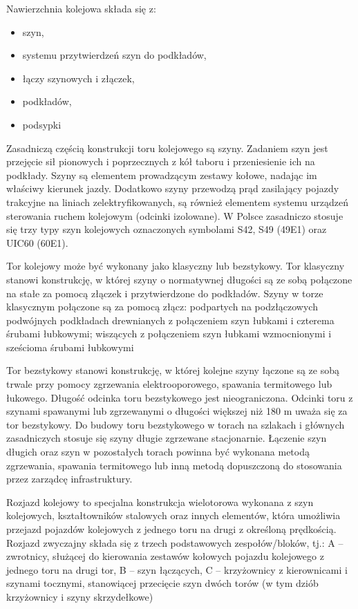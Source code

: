 Nawierzchnia kolejowa składa się z:
\begin{itemize}
\item szyn,
\item systemu przytwierdzeń szyn do podkładów,
\item łączy szynowych i złączek,
\item podkładów,
\item podsypki 
\end{itemize}


Zasadniczą częścią konstrukcji toru kolejowego są szyny. Zadaniem szyn jest przejęcie sił pionowych i poprzecznych z kół taboru i przeniesienie ich na podkłady. Szyny są elementem prowadzącym zestawy kołowe, nadając im właściwy kierunek jazdy. Dodatkowo szyny przewodzą prąd zasilający pojazdy trakcyjne na liniach zelektryfikowanych, są również elementem systemu urządzeń sterowania ruchem kolejowym (odcinki izolowane). W Polsce zasadniczo stosuje się trzy typy szyn kolejowych oznaczonych symbolami S42, S49 (49E1)
oraz UIC60 (60E1).

Tor kolejowy może być wykonany jako klasyczny lub bezstykowy. Tor klasyczny stanowi konstrukcję, w której szyny o normatywnej długości są ze sobą połączone na stałe za pomocą złączek i przytwierdzone do podkładów. Szyny w torze klasycznym połączone są za pomocą złącz:
podpartych na podzłączowych podwójnych podkładach drewnianych z połączeniem szyn łubkami i czterema śrubami łubkowymi;
wiszących z połączeniem szyn łubkami wzmocnionymi i sześcioma śrubami łubkowymi 

Tor bezstykowy stanowi konstrukcję, w której kolejne szyny łączone są ze sobą trwale przy pomocy
zgrzewania elektrooporowego, spawania termitowego lub łukowego. Długość odcinka toru
bezstykowego jest nieograniczona. Odcinki toru z szynami spawanymi lub zgrzewanymi o długości
większej niż 180 m uważa się za tor bezstykowy. Do budowy toru bezstykowego w torach na szlakach
i głównych zasadniczych stosuje się szyny długie zgrzewane stacjonarnie. Łączenie szyn długich oraz
szyn w pozostałych torach powinna być wykonana metodą zgrzewania, spawania termitowego
lub inną metodą dopuszczoną do stosowania przez zarządcę infrastruktury. 

Rozjazd kolejowy to specjalna konstrukcja wielotorowa wykonana z szyn kolejowych,
kształtowników stalowych oraz innych elementów, która umożliwia przejazd pojazdów kolejowych
z jednego toru na drugi z określoną prędkością.
Rozjazd zwyczajny składa się z trzech podstawowych zespołów/bloków, tj.:
A – zwrotnicy, służącej do kierowania zestawów kołowych pojazdu kolejowego
z jednego toru na drugi tor,
B – szyn łączących,
C – krzyżownicy z kierownicami i szynami tocznymi, stanowiącej przecięcie szyn dwóch torów (w tym dziób krzyżownicy i szyny skrzydełkowe)

